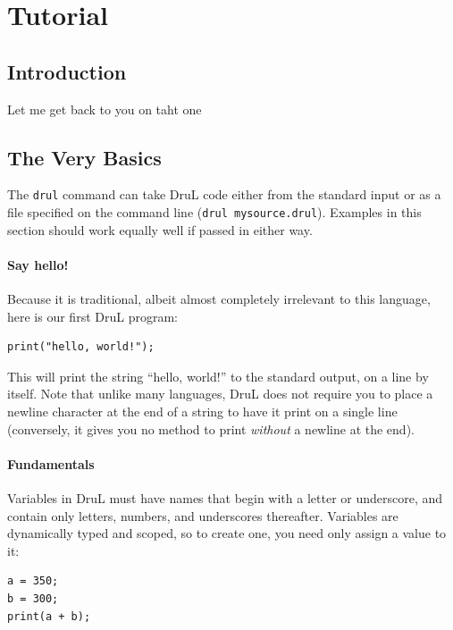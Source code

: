 \chapter{Tutorial}
\section{Introduction}

Let me get back to you on taht one

\section{The Very Basics}

The {\tt drul}  command can take DruL code either from the standard input or as a file specified on the command line ({\tt drul mysource.drul}).  Examples in this section should work equally well if passed in either way.  

\subsubsection{Say hello!}

Because it is traditional, albeit almost completely irrelevant to this language, here is our first 
DruL program:

\begin{lstlisting}
print("hello, world!");
\end{lstlisting}

This will print the string ``hello, world!'' to the standard output, on a line by itself.  Note that unlike many languages, DruL does not require you to place a newline character at the end of a string to have it print on a single line (conversely, it gives you no method to print \emph{without} a newline at the end).

\subsubsection{Fundamentals}

Variables in DruL must have names that begin with a letter or underscore, and contain only letters, numbers, and underscores thereafter.  Variables are dynamically typed and scoped, so to create one, you need only assign a value to it:

\begin{lstlisting}
a = 350;
b = 300;
print(a + b);
\end{lstlisting}

